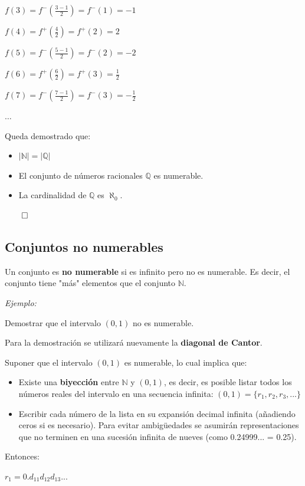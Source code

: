 \documentclass{article}
\begin{document}
$f(3) = f^-(\frac{3 - 1}{2}) = f^-(1) = -1$

$f(4) = f^+(\frac{4}{2}) = f^+(2) = 2$

$f(5) = f^-(\frac{5 - 1}{2}) = f^-(2) = -2$

$f(6) = f^+(\frac{6}{2}) = f^+(3) = \frac{1}{2}$

$f(7) = f^-(\frac{7 - 1}{2}) = f^-(3) = -\frac{1}{2}$

$\dots$

Queda demostrado que:

\begin{itemize}
    \item $\left|\mathbb{N}\right| = \left|\mathbb{Q}\right|$
    \item El conjunto de números racionales $\mathbb{Q}$ es numerable.
    \item La cardinalidad de $\mathbb{Q}$ es $\aleph_0$.
\end{itemize}

$\qed$

\subsection{Conjuntos no numerables}

Un conjunto es \textbf{no numerable} si es infinito pero no es numerable. Es decir, el conjunto tiene "más" elementos que el conjunto $\mathbb{N}$.

\textit{Ejemplo:}

Demostrar que el intervalo $(0, 1)$ no es numerable.

Para la demostración se utilizará nuevamente la \textbf{diagonal de Cantor}.

Suponer que el intervalo $(0, 1)$ es numerable, lo cual implica que:

\begin{itemize}
    \item Existe una \textbf{biyección} entre $\mathbb{N}$ y $(0, 1)$, es decir, es posible listar todos los números reales del intervalo en una secuencia infinita: $(0, 1) = \{r_1, r_2, r_3, ...\}$
    \item Escribir cada número de la lista en su expansión decimal infinita (añadiendo ceros si es necesario). Para evitar ambigüedades se asumirán representaciones que no terminen en una sucesión infinita de nueves (como 0.24999... = 0.25).
\end{itemize}

Entonces:

$r_1 = 0.d_{11}d_{12}d_{13}...$
\end{document}
